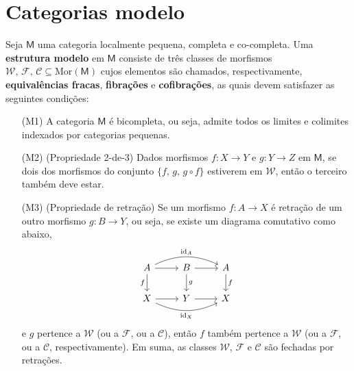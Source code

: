 



\maketitle

\section{Categorias modelo}

\begin{defin}
  Seja $\mathsf{M}$ uma categoria localmente pequena, completa e co-completa.
  Uma \textbf{estrutura modelo} em $\mathsf{M}$ consiste de três classes de morfismos $\mathcal{W},\, \mathcal{F},\, \mathcal{C} \subseteq \mathrm{Mor}(\mathsf{M})$ cujos elementos são chamados, respectivamente, \textbf{equivalências fracas}, \textbf{fibrações} e \textbf{cofibrações}, as quais devem satisfazer as seguintes condições:
  \begin{enumerate}
  \item[(M1)] A categoria $\mathsf{M}$ é bicompleta, ou seja, admite todos os limites e colimites indexados por categorias pequenas.
    
  \item[(M2)] (Propriedade 2-de-3) Dados morfismos $f: X \to Y$ e $g: Y \to Z$ em $\mathsf{M}$, se dois dos morfismos do conjunto $\{f,\,g,\, g \circ f\}$ estiverem em $\mathcal{W}$, então o terceiro também deve estar.
    
  \item[(M3)] (Propriedade de retração) Se um morfismo $f: A \to X$ é retração de um outro morfismo $g: B \to Y$, ou seja, se existe um diagrama comutativo como abaixo,
    \begin{displaymath}
      \begin{tikzcd}
        A
        \arrow[r]
        \arrow[d, "f" swap]
        \arrow[rr, bend left=25, "\id_{A}"]
        & B
        \arrow[r]
        \arrow[d, "g"]
        & A
        \arrow[d, "f"]
        \\ X
        \arrow[r]
        \arrow[rr, bend right=25, "\id_{X}" swap]
        & Y
        \arrow[r]
        & X
      \end{tikzcd}
    \end{displaymath}
    e $g$ pertence a $\mathcal{W}$ (ou a $\mathcal{F}$, ou a $\mathcal{C}$), então $f$ também pertence a $\mathcal{W}$ (ou a $\mathcal{F}$, ou a $\mathcal{C}$, respectivamente).
    Em suma, as classes $\mathcal{W}$, $\mathcal{F}$ e $\mathcal{C}$ são fechadas por retrações.
    

\end{enumerate}
\end{defin}
